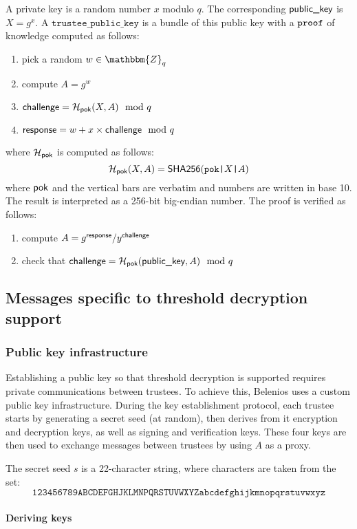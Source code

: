\documentclass[a4paper]{article}
\newcommand{\Z}{\mathbbm{Z}}
\newcommand{\shatwo}{\textsf{SHA256}}
\newcommand{\tpk}{\texttt{trustee\_public\_key}}
\begin{document}
A private key is a random number $x$ modulo $q$. The corresponding
$\textsf{public\_key}$ is $X=g^x$. A $\tpk$ is a bundle of this public key with a
\hyperref[common]{$\texttt{proof}$} of knowledge computed as follows:
\begin{enumerate}
\item pick a random $w\in\Z_q$
\item compute $A=g^w$
\item $\textsf{challenge}=\mathcal{H}_{\textsf{pok}}(X,A)\mod q$
\item $\textsf{response}=w+x\times\textsf{challenge}\mod q$
\end{enumerate}
where $\mathcal{H}_{\textsf{pok}}$ is computed as follows:
\[\Hash_\pok(X,A) = \shatwo(\verb=pok|=X\verb=|=A) \]
where $\textsf{pok}$ and the vertical bars are verbatim and numbers are
written in base 10. The result is interpreted as a 256-bit big-endian
number. The proof is verified as follows:
\begin{enumerate}
\item compute $A={g^{\textsf{response}}}/{y^{\textsf{challenge}}}$
\item check that $\textsf{challenge}=\mathcal{H}_{\textsf{pok}}(\textsf{public\_key},A)\mod q$
\end{enumerate}

\subsection{Messages specific to threshold decryption support}

\subsubsection{Public key infrastructure}
\label{pki}

Establishing a public key so that threshold decryption is supported
requires private communications between trustees. To achieve this,
Belenios uses a custom public key infrastructure. During the key
establishment protocol, each trustee starts by generating a secret
seed (at random), then derives from it encryption and decryption keys,
as well as signing and verification keys. These four keys are then
used to exchange messages between trustees by using $A$ as a proxy.

The secret seed $s$ is a 22-character string, where characters are
taken from the set:
\[\texttt{123456789ABCDEFGHJKLMNPQRSTUVWXYZabcdefghijkmnopqrstuvwxyz}\]

\paragraph{Deriving keys}
\end{document}
